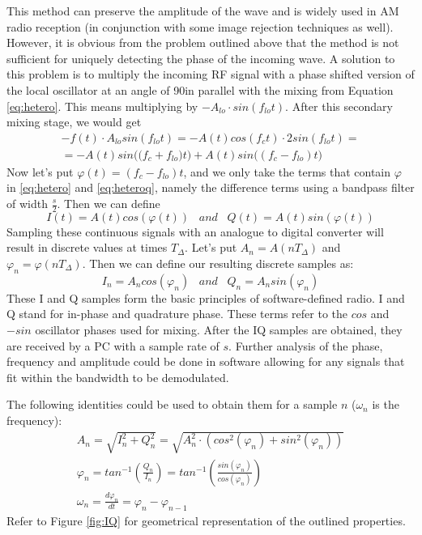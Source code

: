 \documentclass[a4paper,12pt,twoside,openright]{report}
\begin{document}
This method can preserve the amplitude of the wave and is widely used in AM radio reception (in conjunction with some image rejection techniques as well). However, it is obvious from the problem outlined above that the method is not sufficient for uniquely detecting the phase of the incoming wave. A solution to this problem is to multiply the incoming RF signal with a phase shifted version of the local oscillator at an angle of 90\degree in parallel with the mixing from Equation \ref{eq:hetero}. This means multiplying by $-A_{lo} \cdot sin(f_{lo} t)$. After this secondary mixing stage, we would get
\begin{multline}
\label{eq:heteroq}
- f(t) \cdot A_{lo} sin(f_{lo} t) =  -A(t) cos(f_{c} t) \cdot 2 sin(f_{lo} t) = \\
=  - A(t) sin\big( (f_{c} + f_{lo} \big) t\big) + A(t) sin\big( (f_{c} - f_{lo}) t \big)
\end{multline}
Now let's put $\varphi(t) = (f_{c}-f_{lo}) t$, and we only take the terms that contain $\varphi$ in \ref{eq:hetero} and \ref{eq:heteroq}, namely the difference terms using a bandpass filter of width $\frac{s}{2}$. Then we can define
\begin{equation}
I(t) = A(t) cos( \varphi (t)) \,\,\,\,\, and \,\,\,\,\, Q(t) = A(t) sin( \varphi (t))
\end{equation}
Sampling these continuous signals with an analogue to digital converter will result in discrete values at times $T_{\Delta}$. Let's put $A_{n} = A(n T_{\Delta})$ and $\varphi_{n} = \varphi(n T_{\Delta})$. Then we can define our resulting discrete samples as:
\begin{equation}
I_{n} = A_{n} cos( \varphi_{n} ) \,\,\,\,\, and \,\,\,\,\, Q_{n} = A_{n} sin( \varphi _{n})
\end{equation}
These I and Q samples form the basic principles of software-defined radio. I and Q stand for in-phase and quadrature phase\cite{kirkhorn1999introduction}. These terms refer to the $cos$ and $-sin$ oscillator phases used for mixing. After the IQ samples are obtained, they are received by a PC with a sample rate of $s$. Further analysis of the phase, frequency and amplitude could be done in software allowing for any signals that fit within the bandwidth to be demodulated.

The following identities could be used to obtain them for a sample $n$ ($\omega_{n}$ is the frequency):
\begin{subequations}
\begin{align}
A_{n} = \sqrt{I_n^2+Q_n^2} = \sqrt{A_{n}^2 \cdot (cos^2(\varphi_n) + sin^2(\varphi_n))} \\
\varphi_{n} = tan^{-1}\left(\frac{Q_{n}}{I_{n}}\right) = tan^{-1}\left(\frac{sin(\varphi_{n})}{cos(\varphi_{n})}\right) \\
\omega_{n} = \frac{d \varphi_{n}}{dt} = \varphi_{n} - \varphi_{n-1}
\end{align}
\end{subequations}
Refer to Figure \ref{fig:IQ} for geometrical representation of the outlined properties.
\end{document}
